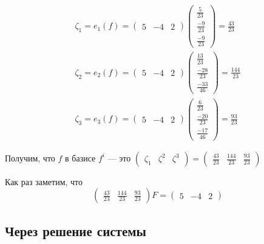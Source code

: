 \documentclass[12pt, a4paper]{article}
\begin{document}
    \begin{gather}
        \zeta_1 = e_1(f) = \begin{pmatrix}
            5 & -4 & 2
        \end{pmatrix} \begin{pmatrix}
            \frac{5}{23} \\
            \frac{-9}{23} \\
            \frac{-9}{23}
        \end{pmatrix} = \frac{43}{23} \\
        \zeta_2 = e_2(f) = \begin{pmatrix}
            5 & -4 & 2
        \end{pmatrix} \begin{pmatrix}
            \frac{13}{23} \\
            \frac{-28}{23} \\
            \frac{-33}{46}
        \end{pmatrix} = \frac{144}{23} \\
        \zeta_3 = e_3(f) = \begin{pmatrix}
            5 & -4 & 2
        \end{pmatrix} \begin{pmatrix}
            \frac{6}{23} \\
            \frac{-20}{23} \\
            \frac{-17}{46}
        \end{pmatrix} = \frac{93}{23}
    \end{gather}

    Получим, что $f$ в базисе $f^i$ — это $\begin{pmatrix} \zeta_1 & \zeta^2 & \zeta^3 \end{pmatrix} = \left(\begin{matrix}\frac{43}{23} & \frac{144}{23} & \frac{93}{23}\end{matrix}\right)$

    Как раз заметим, что 
    \begin{equation}
        \left(\begin{matrix}
            \frac{43}{23} & \frac{144}{23} & \frac{93}{23}
        \end{matrix}\right) F = \left(\begin{matrix}
                5 & -4 & 2
        \end{matrix}\right)
    \end{equation}

    \subsection{Через решение системы}
\end{document}
